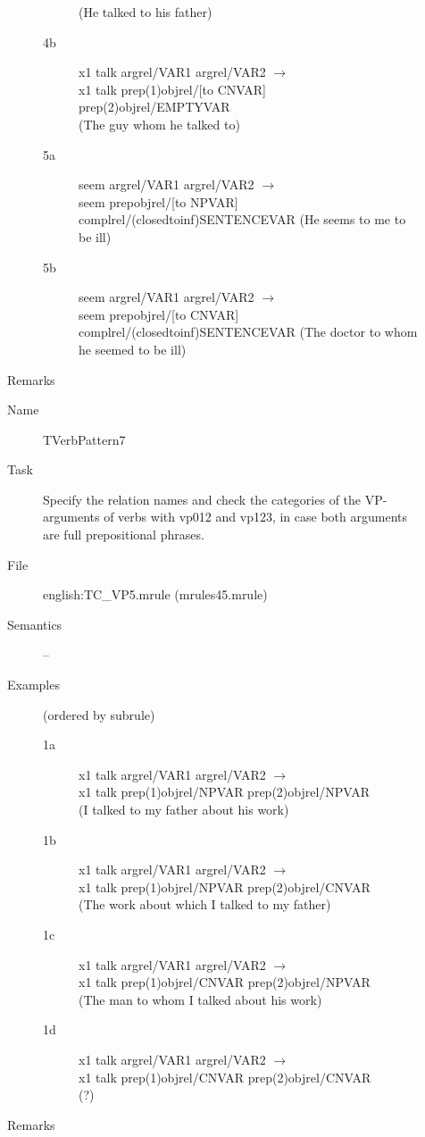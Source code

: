 \begin{description}
\begin{description}
\begin{description}
(He talked to his father)
  \item[4b] x1 talk argrel/VAR1 argrel/VAR2 $\rightarrow$ \\
x1 talk    prep(1)objrel/[to CNVAR] prep(2)objrel/EMPTYVAR \\
(The guy whom he talked to)
  \item[5a] seem argrel/VAR1 argrel/VAR2 $\rightarrow$ \\
seem     prepobjrel/[to NPVAR] complrel/(closedtoinf)SENTENCEVAR
(He seems to me to be ill)
  \item[5b] seem argrel/VAR1 argrel/VAR2 $\rightarrow$ \\
seem     prepobjrel/[to CNVAR] complrel/(closedtoinf)SENTENCEVAR
(The doctor to whom he seemed to be ill)
  \end{description}
\item[Remarks] 
\end{description}

\vspace{1 cm}
\begin{description}
\item[Name] TVerbPattern7
\item[Task] Specify the relation names and check the categories of the VP-arguments 
of verbs with vp012 and vp123, in case both arguments are full prepositional 
phrases.
\item[File] english:TC\_VP5.mrule (mrules45.mrule)
\item[Semantics] --
\item[Examples] (ordered by subrule)
  \begin{description}
  \item[1a] x1 talk argrel/VAR1 argrel/VAR2 $\rightarrow$ \\
x1 talk    prep(1)objrel/NPVAR prep(2)objrel/NPVAR \\
(I talked to my father about his work)
  \item[1b] x1 talk argrel/VAR1 argrel/VAR2 $\rightarrow$ \\
x1 talk    prep(1)objrel/NPVAR prep(2)objrel/CNVAR \\
(The work about which I talked to my father)
  \item[1c] x1 talk argrel/VAR1 argrel/VAR2 $\rightarrow$ \\
x1 talk    prep(1)objrel/CNVAR prep(2)objrel/NPVAR \\
(The man to whom I talked about his work)
  \item[1d] x1 talk argrel/VAR1 argrel/VAR2 $\rightarrow$ \\
x1 talk    prep(1)objrel/CNVAR prep(2)objrel/CNVAR \\
(?)
  \end{description}
\item[Remarks]
\end{description}


\end{description}

